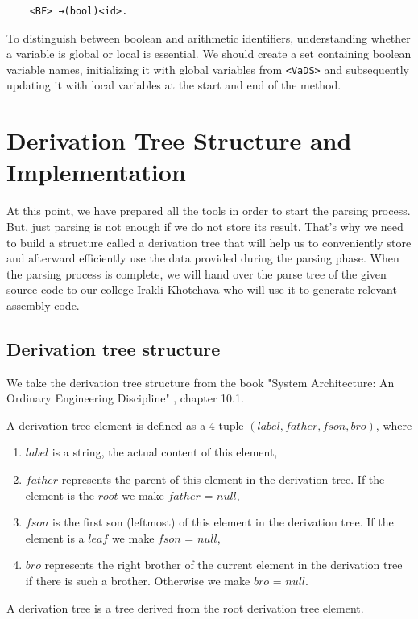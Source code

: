 \begin{verbatim}
    <BF> →(bool)<id>.
\end{verbatim}

To distinguish between boolean and arithmetic identifiers, understanding whether a variable is global or local is essential. We should create a set containing boolean variable names, initializing it with global variables from \texttt{<VaDS>} and subsequently updating it with local variables at the start and end of the method.

\newpage


\section{Derivation Tree Structure and Implementation}\label{sec:Derivation Tree Structure and Implementation}

At this point, we have prepared all the tools in order to start the parsing process. But, just parsing is not enough if we do not store its result. That’s why we need to build a structure called a derivation tree that will help us to conveniently store and afterward efficiently use the data provided during the parsing phase. When the parsing process is complete, we will hand over the parse tree of the given source code to our college Irakli Khotchava who will use it to generate relevant assembly code.

\vspace{10pt}

\subsection{Derivation tree structure}

We take the derivation tree structure from the book "System Architecture: An Ordinary Engineering Discipline" \cite{sysbook}, chapter 10.1.

\begin{definition}[3.0]
    A derivation tree element is defined as a 4-tuple \((label, father, fson, bro)\), where
    \begin{enumerate}
        \item \(label\) is a string, the actual content of this element,
        \item \(father\) represents the parent of this element in the derivation tree. If the element is the \(root\) we make \(father\) = \(null\),
        \item \(fson\) is the first son (leftmost) of this element in the derivation tree. If the element is a \(leaf\) we make \(fson\) = \(null\),
        \item \(bro\) represents the right brother of the current element in the derivation tree if there is such a brother. Otherwise we make \(bro\) = \(null\).
    \end{enumerate}

    A derivation tree is a tree derived from the root derivation tree element.

\end{definition}
\setlength{\parindent}{0pt}

